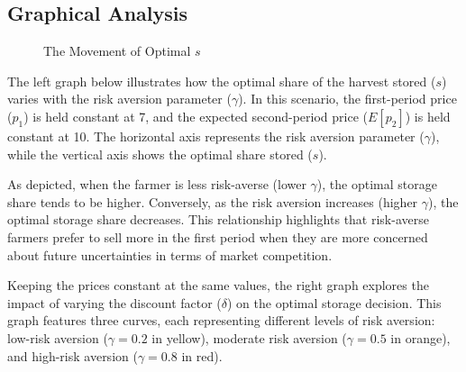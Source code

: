 \documentclass[12pt]{article}
\begin{document}
\subsection{Graphical Analysis}

\begin{figure}[h]
    \centering
    \hfill
    \caption{The Movement of Optimal $s$}
    \label{fig:model demonstration}
\end{figure}


The left graph below illustrates how the optimal share of the harvest stored (\( s \)) varies with the risk aversion parameter (\( \gamma \)). In this scenario, the first-period price (\( p_1 \)) is held constant at 7, and the expected second-period price (\( E[p_2] \)) is held constant at 10. The horizontal axis represents the risk aversion parameter (\( \gamma \)), while the vertical axis shows the optimal share stored (\( s \)).

As depicted, when the farmer is less risk-averse (lower \( \gamma \)), the optimal storage share tends to be higher. Conversely, as the risk aversion increases (higher \( \gamma \)), the optimal storage share decreases. This relationship highlights that risk-averse farmers prefer to sell more in the first period when they are more concerned about future uncertainties in terms of market competition.


Keeping the prices constant at the same values, the right graph explores the impact of varying the discount factor (\( \delta \)) on the optimal storage decision. This graph features three curves, each representing different levels of risk aversion: low-risk aversion (\( \gamma = 0.2 \) in yellow), moderate risk aversion (\( \gamma = 0.5 \) in orange), and high-risk aversion (\( \gamma = 0.8 \) in red).
\end{document}
